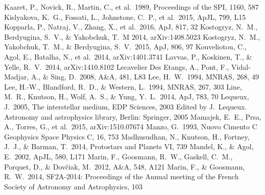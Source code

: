 \documentclass[iop]{emulateapj}
\begin{document}
\begin{thebibliography}{99}
 Kaaret, P., Novick, R., Martin, C., et al.\ 1989, Proceedings of the SPI, 1160, 587
 Kislyakova, K.~G., Fossati, L., Johnstone, C.~P., et al.\ 2015, ApJL, 799, L15 
 Kopparla, P., Natraj, V., Zhang, X., et al.\ 2016, ApJ, 817, 32 
 Kostogryz, N.~M., Berdyugina, S.~V., \& Yakobchuk, T.~M 2014, arXiv:1408.5023
 Kostogryz, N.~M., Yakobchuk, T.~M., \& Berdyugina, S.~V.\ 2015, ApJ, 806, 97 
 Kouveliotou, C., Agol, E., Batalha, N., et al.\ 2014, arXiv:1401.3741 
 Lavvas, P., Koskinen, T., \& Yelle, R.~V.\ 2014, arXiv:1410.8102
 Lecavelier Des Etangs, A., Pont, F., Vidal-Madjar, A., \& Sing, D.\ 2008, A\&A, 481, L83 
 Lee, H.~W.\ 1994, MNRAS, 268, 49 
 Lee, H.-W., Blandford, R.~D., \& Western, L.\ 1994, MNRAS, 267, 303
 Line, M.~R., Knutson, H., Wolf, A.~S., \& Yung, Y.~L.\ 2014, ApJ, 783, 70 
 Lequeux, J.\ 2005, The interstellar medium, EDP Sciences, 2003 Edited by J.~Lequeux.~ Astronomy and astrophysics library, Berlin: Springer, 2005
 Mamajek, E.~E., Prsa, A., Torres, G., et al.\ 2015, arXiv:1510.07674 
 Manzo, G.\ 1993, Nuovo Cimento C Geophysics Space Physics C, 16, 753
 Madhusudhan, N., Knutson, H., Fortney, J.~J., \& Barman, T.\ 2014, Protostars and Planets VI, 739
 Mandel, K., \& Agol, E.\ 2002, ApJL, 580, L171 
 Marin, F., Goosmann, R.~W., Gaskell, C.~M., Porquet, D., \& Dov{\v c}iak, M.\ 2012, A\&A, 548, A121 
 Marin, F., \& Goosmann, R.~W.\ 2014, SF2A-2014: Proceedings of the Annual meeting of the French Society of Astronomy and Astrophysics, 103 

\end{thebibliography}
\end{document}
